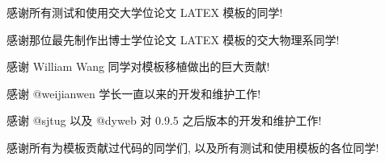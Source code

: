\begin{thanks}
  感谢所有测试和使用交大学位论文 LATEX 模板的同学! 
  
  感谢那位最先制作出博士学位论文 LATEX 模板的交大物理系同学!
  
  感谢 William Wang 同学对模板移植做出的巨大贡献!
  
  感谢 @weijianwen 学长一直以来的开发和维护工作!
  
  感谢 @sjtug 以及 @dyweb 对 0.9.5 之后版本的开发和维护工作! 
  
  感谢所有为模板贡献过代码的同学们, 以及所有测试和使用模板的各位同学!
\end{thanks}